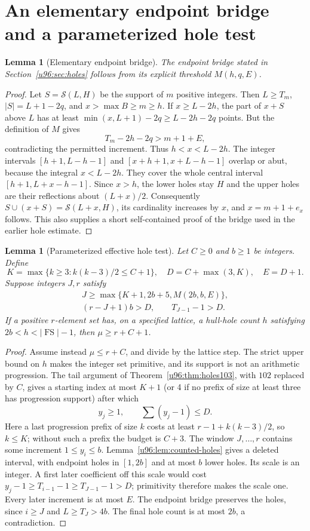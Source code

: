 \documentclass[11pt,a4paper]{article}
\newtheorem{lemma}[theorem]{Lemma}
\theoremstyle{remark}
\newcommand{\FS}{\operatorname{FS}}
\begin{document}
\section{An elementary endpoint bridge and a parameterized hole test}\label{u96:sec:audit}
\begin{lemma}[Elementary endpoint bridge]\label{u96:lem:bridge-proof}
The endpoint bridge stated in Section~\ref{u96:sec:holes} follows from its explicit threshold $M(h,q,E)$.
\end{lemma}
\begin{proof}
Let $S=\mathcal S(L,H)$ be the support of $m$ positive integers. Then
$L\geq T_m$, $|S|=L+1-2q$, and $x>\max B\geq m\geq h$.
If $x\geq L-2h$, the part of $x+S$ above $L$ has at least
$\min(x,L+1)-2q\geq L-2h-2q$ points. But the definition of $M$ gives
\[
 T_m-2h-2q>m+1+E,
\]
contradicting the permitted increment. Thus $h<x<L-2h$.
The integer intervals $[h+1,L-h-1]$ and $[x+h+1,x+L-h-1]$
overlap or abut, because the integral $x<L-2h$. They cover the
whole central interval $[h+1,L+x-h-1]$. Since $x>h$, the lower holes stay $H$
and the upper holes are their reflections about $(L+x)/2$.
Consequently $S\cup(x+S)=\mathcal S(L+x,H)$, its cardinality increases by
$x$, and $x=m+1+e_x$ follows. This also supplies a short self-contained proof
of the bridge used in the earlier hole estimate.
\end{proof}

\begin{lemma}[Parameterized effective hole test]\label{u96:lem:hole-parameter}
Let $C\geq0$ and $b\geq1$ be integers. Define
\[
 K=\max\{k\geq3:k(k-3)/2\leq C+1\},\quad
 D=C+\max(3,K),\quad E=D+1.
\]
Suppose integers $J,r$ satisfy
\begin{gather*}
 J\geq\max\{K+1,2b+5,M(2b,b,E)\},\\
 (r-J+1)b>D,\qquad T_{J-1}-1>D.
\end{gather*}
If a positive $r$-element set has, on a specified lattice, a hull-hole count
$h$ satisfying $2b<h<|\FS|-1$, then $\mu\geq r+C+1$.
\end{lemma}
\begin{proof}
Assume instead $\mu\leq r+C$, and divide by the lattice step. The strict
upper bound on $h$ makes the integer set primitive, and its support is not
an arithmetic progression. The tail argument of
Theorem~\ref{u96:thm:holes103}, with $102$ replaced by $C$, gives a starting
index at most $K+1$ (or 4 if no prefix of size at least three has progression
support) after which
\[
 y_j\geq1,\qquad \sum(y_j-1)\leq D.
\]
Here a last progression prefix of size $k$ costs at least
$r-1+k(k-3)/2$, so $k\leq K$; without such a prefix the budget is $C+3$.
The window $J,\ldots,r$ contains some increment $1\leq y_i\leq b$.
Lemma~\ref{u96:lem:counted-holes} gives a deleted interval, with endpoint holes
in $[1,2b]$ and at most $b$ lower holes. Its scale is an integer. A first
later coefficient off this scale would cost
$y_j-1\geq T_{i-1}-1\geq T_{J-1}-1>D$; primitivity therefore makes the
scale one. Every later increment is at most $E$. The endpoint bridge
preserves the holes, since $i\geq J$ and $L\geq T_J>4b$.
The final hole count is at most $2b$, a contradiction.
\end{proof}
\end{document}
